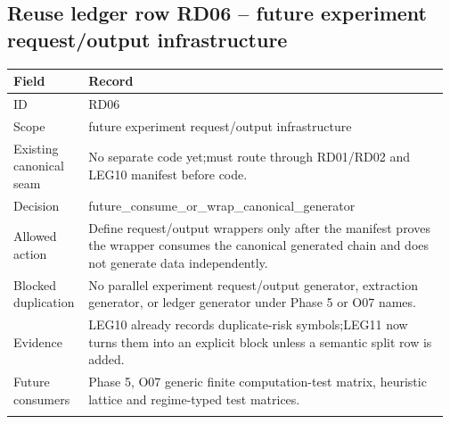 \subsection*{Reuse ledger row RD06 -- future experiment request/\allowbreak{}output infrastructure}
\begin{longtable}{L{0.16\linewidth} L{0.81\linewidth}}
\hline
\textbf{Field} & \textbf{Record}\\
\hline
ID & RD06\\
\hline\addlinespace[0.20em]
Scope & future experiment request/\allowbreak{}output infrastructure\\
\hline\addlinespace[0.20em]
Existing canonical seam & No separate code yet;\newline must route through RD01/\allowbreak{}RD02 and LEG10 manifest before code.\\
\hline\addlinespace[0.20em]
Decision & future\_consume\_or\_wrap\_canonical\_generator\\
\hline\addlinespace[0.20em]
Allowed action & Define request/\allowbreak{}output wrappers only after the manifest proves the wrapper consumes the canonical generated chain and does not generate data independently.\\
\hline\addlinespace[0.20em]
Blocked duplication & No parallel experiment request/\allowbreak{}output generator, extraction generator, or ledger generator under Phase 5 or O07 names.\\
\hline\addlinespace[0.20em]
Evidence & LEG10 already records duplicate-risk symbols;\newline LEG11 now turns them into an explicit block unless a semantic split row is added.\\
\hline\addlinespace[0.20em]
Future consumers & Phase 5, O07 generic finite computation-test matrix, heuristic lattice and regime-typed test matrices.\\
\hline\addlinespace[0.20em]
\end{longtable}
